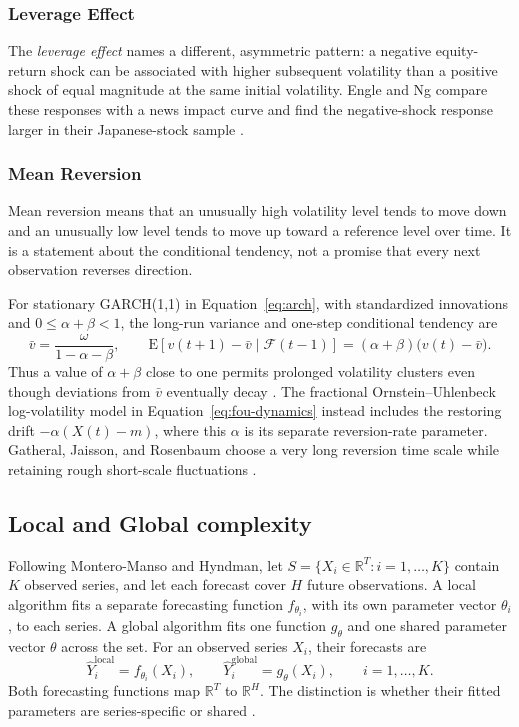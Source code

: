 \documentclass[12pt,a4paper]{article}
\numberwithin{equation}{section}
\numberwithin{table}{section}
\numberwithin{figure}{section}
\begin{document}
\subsubsection{Leverage Effect}
The \emph{leverage effect} names a different, asymmetric pattern: a negative equity-return shock can be associated with higher subsequent volatility than a positive shock of equal magnitude at the same initial volatility. Engle and Ng compare these responses with a news impact curve and find the negative-shock response larger in their Japanese-stock sample \cite{engle1993}. 

\subsubsection{Mean Reversion}
Mean reversion means that an unusually high volatility level tends to move down and an unusually low level tends to move up toward a reference level over time. It is a statement about the conditional tendency, not a promise that every next observation reverses direction.

For stationary GARCH(1,1) in Equation~\eqref{eq:arch}, with standardized innovations and $0\leq\alpha+\beta<1$, the long-run variance and one-step conditional tendency are
\begin{equation}\label{eq:garch-mean-reversion}
\bar v=\frac{\omega}{1-\alpha-\beta},\qquad
\mathrm E\!\left[v(t+1)-\bar v\mid\mathcal F(t-1)\right]
=(\alpha+\beta)\bigl(v(t)-\bar v\bigr).
\end{equation}
Thus a value of $\alpha+\beta$ close to one permits prolonged volatility clusters even though deviations from $\bar v$ eventually decay \cite{bollerslev1986}. The fractional Ornstein--Uhlenbeck log-volatility model in Equation~\eqref{eq:fou-dynamics} instead includes the restoring drift $-\alpha(X(t)-m)$, where this $\alpha$ is its separate reversion-rate parameter. Gatheral, Jaisson, and Rosenbaum choose a very long reversion time scale while retaining rough short-scale fluctuations \cite{gatheral2018}. 

\subsection{Local and Global complexity}
Following Montero-Manso and Hyndman, let $S=\{X_i\in\mathbb{R}^{T}:i=1,\ldots,K\}$ contain $K$ observed series, and let each forecast cover $H$ future observations. A local algorithm fits a separate forecasting function $f_{\theta_i}$, with its own parameter vector $\theta_i$, to each series. A global algorithm fits one function $g_{\theta}$ and one shared parameter vector $\theta$ across the set. For an observed series $X_i$, their forecasts are
\begin{equation}\label{eq:local-global-forecasts}
\widehat{Y}^{\mathrm{local}}_i=f_{\theta_i}(X_i),\qquad
\widehat{Y}^{\mathrm{global}}_i=g_{\theta}(X_i),\qquad i=1,\ldots,K.
\end{equation}
Both forecasting functions map $\mathbb{R}^{T}$ to $\mathbb{R}^{H}$. The distinction is whether their fitted parameters are series-specific or shared \cite{monteromanso2021}.
\end{document}
